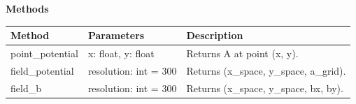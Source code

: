 \documentclass[11pt,a4paper]{article}
\begin{document}
\vspace{0.5cm}
\noindent\textbf{Methods}

\begin{table}[h]
  \centering
  \renewcommand{\arraystretch}{1.3}
  \footnotesize
  \begin{tabularx}{\textwidth}{>{\raggedright\arraybackslash}p{3.5cm} 
                  >{\raggedright\arraybackslash}p{3cm}
                  >{\raggedright\arraybackslash}X}
    \toprule
    \textbf{Method} & \textbf{Parameters} & \textbf{Description} \\
    \midrule
    point\_potential & x: float, y: float & Returns A at point (x, y). \\
    field\_potential & resolution: int = 300 & Returns (x\_space, y\_space, a\_grid). \\
    field\_b & resolution: int = 300 & Returns (x\_space, y\_space, bx, by). \\
    \bottomrule
  \end{tabularx}
\end{table}
\end{document}
